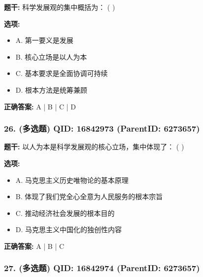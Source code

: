 \documentclass[12pt,UTF8]{ctexart}
\begin{document}
\textbf{题干:}
科学发展观的集中概括为： ( )



\textbf{选项:}
\begin{itemize}[leftmargin=*]

  \item A. 第一要义是发展

  \item B. 核心立场是以人为本

  \item C. 基本要求是全面协调可持续

  \item D. 根本方法是统筹兼顾

\end{itemize}

\textbf{正确答案:}
A | B | C | D

\vspace{0.3em}\hrulefill\vspace{0.7em}

\subsubsection*{26. (多选题) \small QID: 16842973 (ParentID: 6273657)}

\textbf{题干:}
以人为本是科学发展观的核心立场，集中体现了： ( )



\textbf{选项:}
\begin{itemize}[leftmargin=*]

  \item A. 马克思主义历史唯物论的基本原理

  \item B. 体现了我们党全心全意为人民服务的根本宗旨

  \item C. 推动经济社会发展的根本目的

  \item D. 马克思主义中国化的独创性内容

\end{itemize}

\textbf{正确答案:}
A | B | C

\vspace{0.3em}\hrulefill\vspace{0.7em}

\subsubsection*{27. (多选题) \small QID: 16842974 (ParentID: 6273657)}
\end{document}
